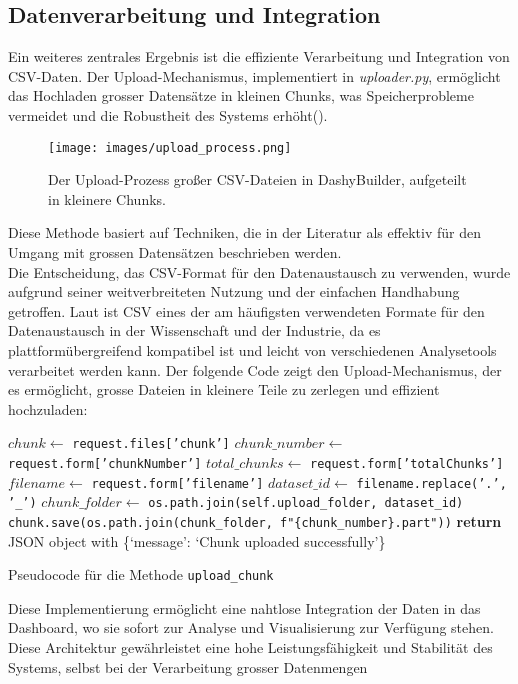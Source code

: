 \documentclass[a4paper, 12pt]{scrartcl}
\begin{document}
\subsection{Datenverarbeitung und Integration}
Ein weiteres zentrales Ergebnis ist die effiziente Verarbeitung und Integration von \ac{CSV}-Daten. Der Upload-Mechanismus, implementiert in \textit{uploader.py}, ermöglicht das Hochladen grosser Datensätze in kleinen Chunks, was Speicherprobleme vermeidet und die Robustheit des Systems erhöht(\cite{Ge2019}).
\begin{figure}[H]
    \centering
    \texttt{[image: images/upload\_process.png]}
    \caption{Der Upload-Prozess großer CSV-Dateien in DashyBuilder, aufgeteilt in kleinere Chunks.}
    \label{fig:upload_process}
\end{figure}
Diese Methode basiert auf Techniken, die in der Literatur als effektiv für den Umgang mit grossen Datensätzen beschrieben werden.\\[1em] Die Entscheidung, das \ac{CSV}-Format für den Datenaustausch zu verwenden, wurde aufgrund seiner weitverbreiteten Nutzung und der einfachen Handhabung getroffen. Laut \textcite{Freeman2019} ist \ac{CSV} eines der am häufigsten verwendeten Formate für den Datenaustausch in der Wissenschaft und der Industrie, da es plattformübergreifend kompatibel ist und leicht von verschiedenen Analysetools verarbeitet werden kann. Der folgende Code zeigt den Upload-Mechanismus, der es ermöglicht, grosse Dateien in kleinere Teile zu zerlegen und effizient hochzuladen:
\newpage
\begin{algorithm}[H]
\SetAlgoLined
{}
$chunk \gets$ \texttt{request.files['chunk']}\;
$chunk\_number \gets$ \texttt{request.form['chunkNumber']}\;
$total\_chunks \gets$ \texttt{request.form['totalChunks']}\;
$filename \gets$ \texttt{request.form['filename']}\;
$dataset\_id \gets$ \texttt{filename.replace('.', '\_')}\;
$chunk\_folder \gets$ \texttt{os.path.join(self.upload\_folder, dataset\_id)}\;
\texttt{chunk.save(os.path.join(chunk\_folder, f"\{chunk\_number\}.part"))}\;
\textbf{return} JSON object with \{`message': `Chunk uploaded successfully'\}\;
\caption{Pseudocode für die Methode \texttt{upload\_chunk}}
\end{algorithm}
Diese Implementierung ermöglicht eine nahtlose Integration der Daten in das Dashboard, wo sie sofort zur Analyse und Visualisierung zur Verfügung stehen. Diese Architektur gewährleistet eine hohe Leistungsfähigkeit und Stabilität des Systems, selbst bei der Verarbeitung grosser Datenmengen
\end{document}
